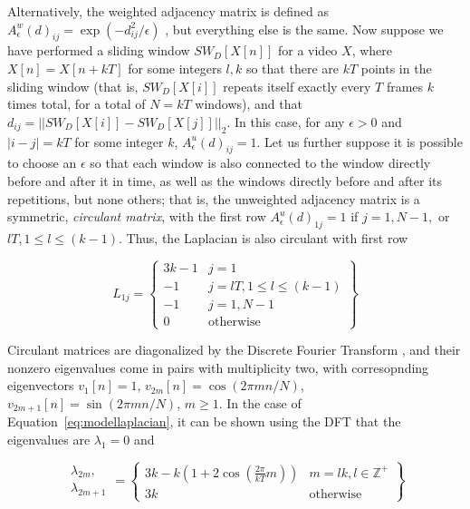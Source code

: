 \documentclass{article}
\begin{document}
Alternatively, the weighted adjacency matrix is defined as $A_{\epsilon}^w(d)_{ij} = \exp(-d_{ij}^2/\epsilon)$ \cite{belkin2003laplacian}, but everything else is the same.  Now suppose we have performed a sliding window $SW_{D}[X[n]]$ for a video $X$, where $X[n] = X[n+kT]$ for some integers $l, k$ so that there are $kT$ points in the sliding window (that is, $SW_{D}[X[i]]$ repeats itself exactly every $T$ frames $k$ times total, for a total of $N = kT$ windows), and that $d_{ij} = ||SW_{D}[X[i]] - SW_{D}[X[j]]||_2$.  In this case, for any $\epsilon > 0$ and $|i - j| = kT$ for some integer $k$, $A^u_{\epsilon}(d)_{ij} = 1$.  Let us further suppose it is possible to choose an $\epsilon$ so that each window is also connected to the window directly before and after it in time, as well as the windows directly before and after its repetitions, but none others; that is, the unweighted adjacency matrix is a symmetric, {\em circulant matrix}, with the first row $A_{\epsilon}^u(d)_{1j} = 1$ if $j = 1, N-1,$ or $lT, 1 \leq l \leq (k-1)$.  Thus, the Laplacian is also circulant with first row

\begin{equation}
\label{eq:modellaplacian}
L_{1j} = \left\{ \begin{array}{cc} 3k-1 & j = 1 \\ -1 & j = lT, 1 \leq l \leq (k-1) \\ -1 & j = 1, N-1 \\ 0 & \text{otherwise} \end{array} \right\}
\end{equation}

Circulant matrices are diagonalized by the Discrete Fourier Transform \cite{godsil2013algebraic}, and their nonzero eigenvalues come in pairs with multiplicity two, with corresopnding eigenvectors $v_1[n] = 1$, $v_{2m}[n] = \cos(2 \pi mn / N)$, $v_{2m+1}[n] = \sin(2 \pi m n / N)$, $m \geq 1$.  In the case of Equation~\ref{eq:modellaplacian}, it can be shown using the DFT that the eigenvalues are $\lambda_1 = 0$ and 

\begin{equation}
\begin{array}{cc}\lambda_{2m},\\\lambda_{2m+1}\end{array} = \left\{ \begin{array}{cc} 3k - k\left( 1 + 2 \cos \left( \frac{2 \pi}{kT} m \right) \right) & m = lk, l \in \mathbb{Z}^+ \\ 3k & \text{otherwise}  \end{array} \right\} 
\end{equation}
\end{document}
